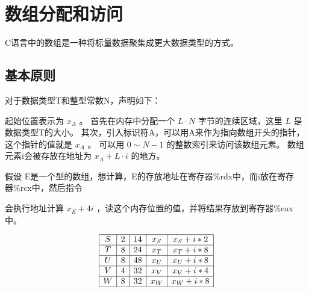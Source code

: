 
\section{数组分配和访问}
{
    C语言中的数组是一种将标量数据聚集成更大数据类型的方式。

    \subsection{基本原则}
    {
        对于数据类型T和整型常数N，声明如下：


        起始位置表示为 $x_A$ 。
        首先在内存中分配一个 $L \cdot N$ 字节的连续区域，这里 $L$ 是数据类型T的大小。
        其次，引入标识符A，可以用A来作为指向数组开头的指针，这个指针的值就是 $x_A$ 。
        可以用 $0 \sim N - 1$ 的整数索引来访问该数组元素。
        数组元素i会被存放在地址为 $x_A + L \cdot i$ 的地方。

        假设 E是一个型的数组，想计算，E的存放地址在寄存器\%rdx中，而i放在寄存器\%rcx中，然后指令


        会执行地址计算 $x_E + 4i$ ，读这个内存位置的值，并将结果存放到寄存器\%eax中。

        \begin{practicec}
            \begin{table}[htb]
                \centering

                \[
                    \begin{array}{|c|c|c|c|c|}
                        \hline
                        S & 2 & 14 & x_S & x_S + i * 2 \\
                        \hline
                        T & 8 & 24 & x_T & x_T + i * 8 \\
                        \hline
                        U & 8 & 48 & x_U & x_U + i * 8 \\
                        \hline
                        V & 4 & 32 & x_V & x_V + i * 4 \\
                        \hline
                        W & 8 & 32 & x_W & x_W + i * 8 \\
                        \hline
                    \end{array}
                \]
            \end{table}
        \end{practicec}
    }

}
